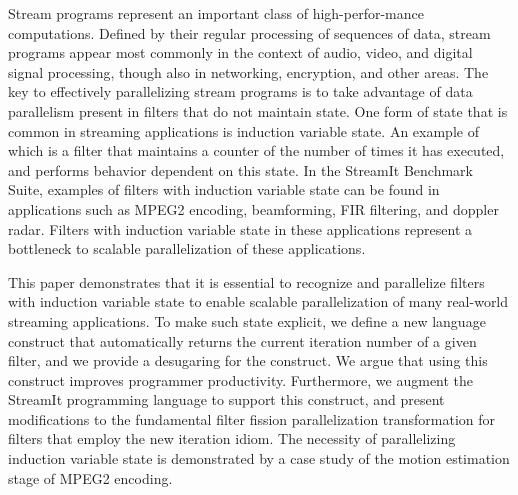 Stream programs represent an important class of high-perfor-mance
computations. Defined by their regular processing of sequences of data,
stream programs appear most commonly in the context of audio, video,
and digital signal processing, though also in networking, encryption,
and other areas. The key to effectively parallelizing stream programs
is to take advantage of data parallelism present in filters that do
not maintain state.  One form of state that is common in streaming
applications is induction variable state.  An example of which is a
filter that maintains a counter of the number of times it has
executed, and performs behavior dependent on this state.  In the
StreamIt Benchmark Suite, examples of filters with induction variable
state can be found in applications such as MPEG2 encoding,
beamforming, FIR filtering, and doppler radar.  Filters with induction
variable state in these applications represent a bottleneck to
scalable parallelization of these applications.

This paper demonstrates that it is essential to recognize and
parallelize filters with induction variable state to enable scalable
parallelization of many real-world streaming applications.  To make
such state explicit, we define a new language construct that
automatically returns the current iteration number of a given filter,
and we provide a desugaring for the construct.  We argue that using this
construct improves programmer productivity.  Furthermore, we augment
the StreamIt programming language to support this construct, and
present modifications to the fundamental filter fission
parallelization transformation for filters that employ the new
iteration idiom.  The necessity of parallelizing induction variable
state is demonstrated by a case study of the motion estimation stage
of MPEG2 encoding.



